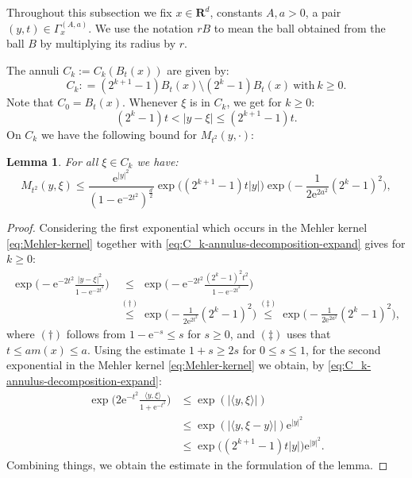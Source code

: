 \documentclass{amsart}
\newtheorem{lemma}{Lemma}
\theoremstyle{remark}
\newcommand{\la}{\langle}
\newcommand{\ra}{\rangle}
\renewcommand{\leq}{\leqslant}
\renewcommand{\geq}{\geqslant}
\newcommand{\R}{\mathbf R}
\newcommand{\e}{\mathrm{e}} %
\begin{document}
Throughout this subsection we fix $x \in \R^d$, constants $A, a > 0$, a pair
$(y,t) \in \Gamma_x^{(A,a)}$. We use the notation $rB$ to mean the ball obtained
from the ball $B$ by multiplying its radius by $r$.

The annuli $C_k := C_k(B_t(x))$ are given by:
\begin{equation}
  \label{eq:C_k-annulus-decomposition}
  C_k : = (2^{k + 1} - 1)B_t(x) \setminus (2^k - 1)B_t(x)
  \:\text{with}\: k \geq 0.
\end{equation}
Note that $C_0 = B_t(x)$. Whenever $\xi$ is in $C_k$, we get for $k
\geq 0$:
\begin{equation}
  \label{eq:C_k-annulus-decomposition-expand}
  (2^k - 1) t < |y - \xi| \leq (2^{k + 1} - 1) t.
\end{equation}
On $C_k$ we have the following bound for $M_{t^2}(y,\cdot)$:
\begin{lemma}\label{lem:On-diagonal-kernel-estimates-on-Ck}
  For all $\xi \in C_k$ we have:
  \begin{equation}
    M_{t^2}(y, \xi) \leq \frac{\e^{|y|^2}}{(1 - \e^{-2t^2})^{\frac{d}2}}
    \exp\bigl((2^{k + 1} - 1) t |y| \bigr) \exp\Big(\!-\!\frac1{2 \e^{2 a^2}} (2^k - 1)^2 \Big),
  \end{equation}
\end{lemma}
\begin{proof}
  Considering the first exponential which occurs in the Mehler kernel
  \eqref{eq:Mehler-kernel} together with
  \eqref{eq:C_k-annulus-decomposition-expand} gives for $k \geq 0$:
  \begin{align*}
    \exp\biggl(-\e^{-2t^2} \frac{|y - \xi|^2}{1 - \e^{-2t^2}} \biggr)
    &\overset{\phantom{(\dagger)}}{\leq} \exp\biggl(-\e^{-2t^2} \frac{(2^k - 1)^2 t^2}{1 - \e^{-2t^2}} \biggr)\\
    &\overset{(\dagger)}{\leq} \exp\biggl(-\frac1{2 \e^{2t^2}} (2^k - 1)^2 \biggr)
    \overset{(\ddagger)}{\leq} \exp\biggl(-\frac1{2 \e^{2a^2}} (2^k - 1)^2 \biggr),
  \end{align*}
  where $(\dagger)$ follows from $1 - \e^{-s} \leq s$ for $s \geq 0$, and $(\ddagger)$
  uses that $t \leq am(x) \leq a$. Using the estimate $1 + s \geq 2s$ for $0
  \leq s \leq 1$, for the second exponential in the Mehler kernel
  \eqref{eq:Mehler-kernel} we obtain, by
  \eqref{eq:C_k-annulus-decomposition-expand}:
  \begin{align*}
    \exp\biggl(2\e^{-t^2} \frac{\la y, \xi \ra}{1 + \e^{- t^2}} \biggr)
    & \leq \exp(|\la y, \xi \ra|)\\
    & \leq \exp(|\langle y, \xi-y\rangle|) \e^{|y|^2}\\
    & \leq \exp\bigl((2^{k + 1} - 1) t |y| \bigr) \e^{|y|^2}.
  \end{align*}
  Combining things, we obtain the estimate in the formulation of the lemma.
\end{proof}
\end{document}
